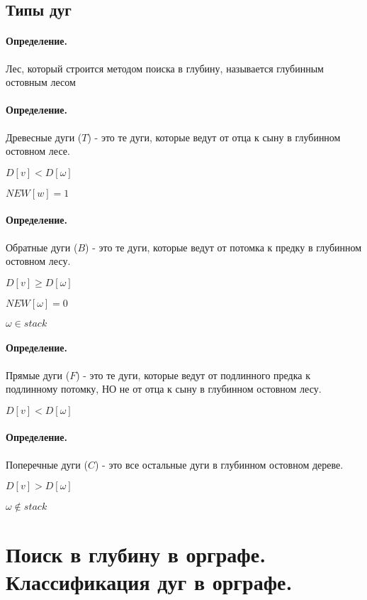 \documentclass{report}
\begin{document}
\subsection{Типы дуг}

\paragraph*{Определение.}
Лес, который строится методом поиска в глубину, называется глубинным остовным лесом

\paragraph*{Определение.}
Древесные дуги ($T$) - это те дуги, которые ведут от отца к сыну в глубинном остовном лесе.

$D[v] < D[\omega]$

$NEW[w] = 1$

\paragraph*{Определение.}
Обратные дуги ($B$) - это те дуги, которые ведут от потомка к предку в глубинном остовном лесу.

$D[v] \ge  D[\omega]$

$NEW[\omega] = 0$

$\omega \in stack$

\paragraph*{Определение.}
Прямые дуги ($F$) - это те дуги, которые ведут от подлинного предка к подлинному потомку, НО
не от отца к сыну в глубинном остовном лесу.

$D[v] < D[\omega]$

\paragraph*{Определение.}
Поперечные дуги ($C$) - это все остальные дуги в глубинном остовном дереве.

$D[v] > D[\omega]$

$\omega \notin stack $

\newpage

\section{Поиск в глубину в орграфе. Классификация дуг в орграфе.}
\end{document}
